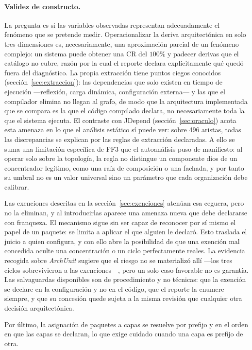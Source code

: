 \paragraph{Validez de constructo.} La pregunta es si las variables observadas representan adecuadamente el fenómeno que se pretende medir. Operacionalizar la deriva arquitectónica en solo tres dimensiones es, necesariamente, una aproximación parcial de un fenómeno complejo: un sistema puede obtener una CR del $100\%$ y padecer derivas que el catálogo no cubre, razón por la cual el reporte declara explícitamente qué quedó fuera del diagnóstico. La propia extracción tiene puntos ciegos conocidos (sección~\ref{sec:extraccion}): las dependencias que solo existen en tiempo de ejecución ---reflexión, carga dinámica, configuración externa--- y las que el compilador elimina no llegan al grafo, de modo que la arquitectura implementada que se compara es la que el código compilado declara, no necesariamente toda la que el sistema ejecuta. El contraste con JDepend (sección~\ref{sec:oraculo}) acota esta amenaza en lo que el análisis estático sí puede ver: sobre 496 aristas, todas las discrepancias se explican por las reglas de extracción declaradas. A ello se suma una limitación específica de FF3 que el autoanálisis puso de manifiesto: al operar solo sobre la topología, la regla no distingue un componente dios de un concentrador legítimo, como una raíz de composición o una fachada, y por tanto su umbral no es un valor universal sino un parámetro que cada organización debe calibrar.

Las exenciones descritas en la sección~\ref{sec:exenciones} atenúan esa ceguera, pero no la eliminan, y al introducirlas aparece una amenaza nueva que debe declararse con franqueza. El mecanismo sigue sin ser capaz de reconocer por sí mismo el papel de un paquete: se limita a aplicar el que alguien le declaró. Esto traslada el juicio a quien configura, y con ello abre la posibilidad de que una exención mal concedida oculte una concentración o un ciclo perfectamente reales. La evidencia recogida sobre \textit{ArchUnit} sugiere que el riesgo no se materializó allí ---los tres ciclos sobrevivieron a las exenciones---, pero un solo caso favorable no es garantía. Las salvaguardas disponibles son de procedimiento y no técnicas: que la exención se declare en la configuración y no en el código, que el reporte la enumere siempre, y que su concesión quede sujeta a la misma revisión que cualquier otra decisión arquitectónica.

Por último, la asignación de paquetes a capas se resuelve por prefijo y en el orden en que las capas se declaran, lo que exige cuidado cuando una capa es prefijo de otra.

